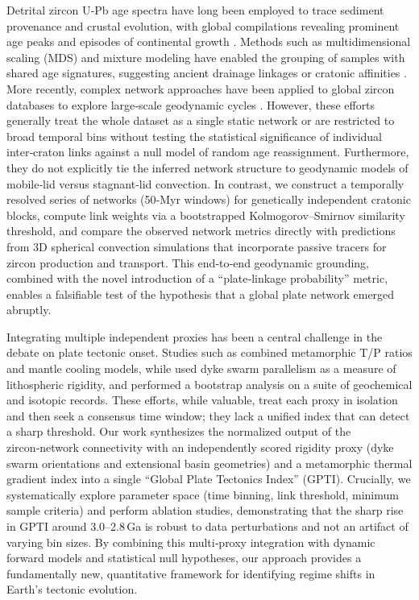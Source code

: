 \documentclass{article}
\begin{document}
Detrital zircon U‑Pb age spectra have long been employed to trace sediment provenance and crustal evolution, with global compilations revealing prominent age peaks and episodes of continental growth \cite{voice_global_zircon_2011, condie_aster_global_zircon_2010, cawood_zircon_recording_2013}. Methods such as multidimensional scaling (MDS) and mixture modeling have enabled the grouping of samples with shared age signatures, suggesting ancient drainage linkages or cratonic affinities \cite{gehrels_zircon_provenance2014, vermeesch_multidimensional_zircon2013}. More recently, complex network approaches have been applied to global zircon databases to explore large‑scale geodynamic cycles \cite{puetz_network_zircon_2021, cheng_mineral_network_2022}. However, these efforts generally treat the whole dataset as a single static network or are restricted to broad temporal bins without testing the statistical significance of individual inter‑craton links against a null model of random age reassignment. Furthermore, they do not explicitly tie the inferred network structure to geodynamic models of mobile‑lid versus stagnant‑lid convection. In contrast, we construct a temporally resolved series of networks (50‑Myr windows) for genetically independent cratonic blocks, compute link weights via a bootstrapped Kolmogorov–Smirnov similarity threshold, and compare the observed network metrics directly with predictions from 3D spherical convection simulations that incorporate passive tracers for zircon production and transport. This end‑to‑end geodynamic grounding, combined with the novel introduction of a “plate‑linkage probability” metric, enables a falsifiable test of the hypothesis that a global plate network emerged abruptly.

Integrating multiple independent proxies has been a central challenge in the debate on plate tectonic onset. Studies such as \cite{holder_global_proxies2019} combined metamorphic T/P ratios and mantle cooling models, while \cite{evans_dyke_swarm_rigidity2020} used dyke swarm parallelism as a measure of lithospheric rigidity, and \cite{keller_statistical_onset2017} performed a bootstrap analysis on a suite of geochemical and isotopic records. These efforts, while valuable, treat each proxy in isolation and then seek a consensus time window; they lack a unified index that can detect a sharp threshold. Our work synthesizes the normalized output of the zircon‑network connectivity with an independently scored rigidity proxy (dyke swarm orientations and extensional basin geometries) and a metamorphic thermal gradient index into a single “Global Plate Tectonics Index” (GPTI). Crucially, we systematically explore parameter space (time binning, link threshold, minimum sample criteria) and perform ablation studies, demonstrating that the sharp rise in GPTI around 3.0–2.8 Ga is robust to data perturbations and not an artifact of varying bin sizes. By combining this multi‑proxy integration with dynamic forward models and statistical null hypotheses, our approach provides a fundamentally new, quantitative framework for identifying regime shifts in Earth’s tectonic evolution.
\end{document}
